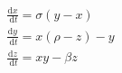 \documentclass[preview]{standalone}
\begin{document}
\begin{align*}
\frac{\mathrm{d} x}{\mathrm{~d} t} = \sigma(y-x) \\
            \frac{\mathrm{d} y}{\mathrm{~d} t} = x(\rho-z)-y \\
            \frac{\mathrm{d} z}{\mathrm{~d} t} = x y-\beta z
\end{align*}
\end{document}
